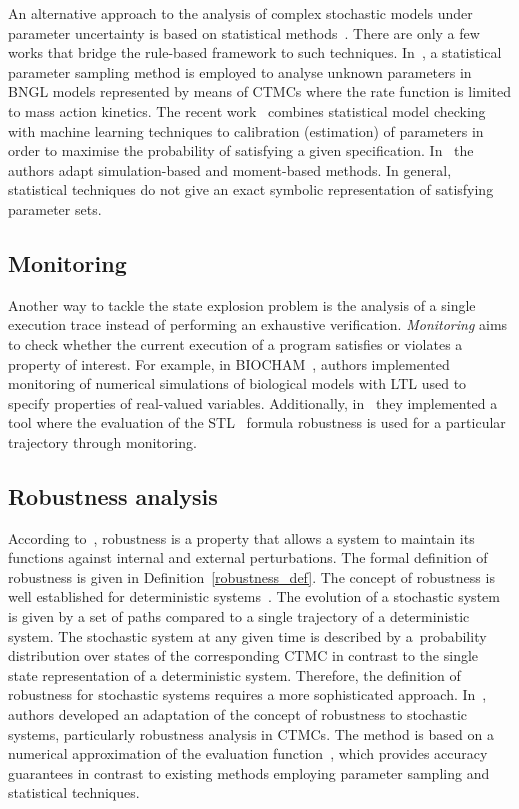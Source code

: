 \documentclass[11pt,a4paper]{report}
\begin{document}
An alternative approach to the analysis of complex stochastic models under
parameter uncertainty is based on statistical methods~\cite{Luck2016,BackenkohlerBW18,Bortolussi2016,Bortolussi2018}. There are only a few works that bridge the rule-based framework to such techniques. In~\cite{liu2016parameter}, a statistical parameter sampling method is employed to analyse unknown parameters in BNGL models represented by means of CTMCs where the rate function is limited to mass action kinetics. The recent work~\cite{KJ18} combines statistical model checking with machine learning techniques to calibration (estimation) of parameters in order to maximise the probability of satisfying a given specification. In~\cite{Bock15} the authors adapt simulation-based and moment-based methods. In general, statistical techniques do not give an exact symbolic representation of satisfying parameter sets. 

\subsection{Monitoring}

Another way to tackle the state explosion problem is the analysis of a single execution trace instead of performing an exhaustive verification. \emph{Monitoring} aims to check whether the current execution of a program satisfies or violates a property of interest. For example, in BIOCHAM~\cite{calzone2006biocham}, authors implemented monitoring of numerical simulations of biological models with LTL used to specify properties of real-valued variables. Additionally, in~\cite{donze2010breach} they implemented a tool where the evaluation of the STL~\cite{maler2004monitoring} formula robustness is used for a particular trajectory through monitoring.

\subsection{Robustness analysis}

According to~\cite{kitano2004biological}, robustness is a property that allows a system to maintain its functions against internal and external perturbations. The formal definition of robustness is given in Definition~\ref{robustness_def}. The concept of robustness is well established for deterministic systems~\cite{donze2011robustness,rizk2009general}. The evolution of a stochastic system is given
by a set of paths compared to a single trajectory of a deterministic system. The stochastic system at any given time is described by a~probability distribution over states of the corresponding CTMC in contrast to the single state representation of a deterministic system. Therefore, the definition of robustness for stochastic systems requires a more sophisticated approach. In~\cite{vceska2014robustness}, authors developed an adaptation of the concept of robustness to stochastic systems, particularly robustness analysis in CTMCs. The method is based on a numerical approximation of the evaluation function~\cite{brim2013exploring}, which provides accuracy guarantees in contrast to existing methods employing parameter sampling and statistical techniques.
\end{document}
